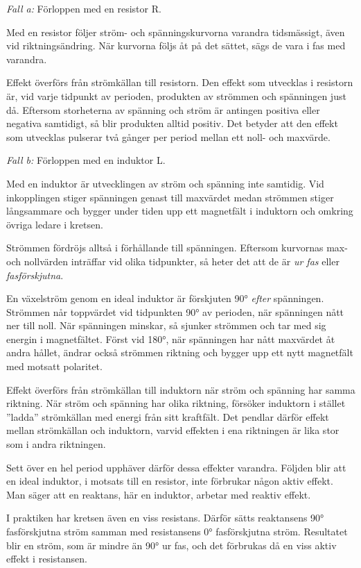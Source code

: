 \emph{Fall a:} Förloppen med en resistor R.

Med en resistor följer ström- och spänningskurvorna varandra tidsmässigt, även
vid riktningsändring. När kurvorna följs åt på det sättet, sägs de vara i fas
med varandra.

Effekt överförs från strömkällan till resistorn. Den effekt som utvecklas i
resistorn är, vid varje tidpunkt av perioden, produkten av strömmen och
spänningen just då. Eftersom storheterna av spänning och ström är antingen
positiva eller negativa samtidigt, så blir produkten alltid positiv. Det betyder
att den effekt som utvecklas pulserar två gånger per period mellan ett noll- och
maxvärde.

\emph{Fall b:} Förloppen med en induktor L.

Med en induktor är utvecklingen av ström och spänning inte samtidig. Vid
inkopplingen stiger spänningen genast till maxvärdet medan strömmen stiger
långsammare och bygger under tiden upp ett magnetfält i induktorn och omkring
övriga ledare i kretsen.

Strömmen fördröjs alltså i förhållande till spänningen. Eftersom kurvornas max-
och nollvärden inträffar vid olika tidpunkter, så heter det att de är
\emph{ur fas} eller \emph{fasförskjutna}.

En växelström genom en ideal induktor är förskjuten 90° \emph{efter}
spänningen. Strömmen når toppvärdet vid tidpunkten 90° av perioden, när
spänningen nått ner till noll. När spänningen minskar, så sjunker strömmen och
tar med sig energin i magnetfältet. Först vid 180°, när spänningen har nått
maxvärdet åt andra hållet, ändrar också strömmen riktning och bygger upp ett
nytt magnetfält med motsatt polaritet.

Effekt överförs från strömkällan till induktorn när ström och spänning har samma
riktning. När ström och spänning har olika riktning, försöker induktorn i
stället ''ladda'' strömkällan med energi från sitt kraftfält. Det pendlar därför
effekt mellan strömkällan och induktorn, varvid effekten i ena riktningen är
lika stor som i andra riktningen.

Sett över en hel period upphäver därför dessa effekter varandra. Följden blir
att en ideal induktor, i motsats till en resistor, inte förbrukar någon aktiv
effekt. Man säger att en reaktans, här en induktor, arbetar med reaktiv effekt.

I praktiken har kretsen även en viss resistans. Därför sätts reaktansens 90°
fasförskjutna ström samman med resistansens 0° fasförskjutna ström. Resultatet
blir en ström, som är mindre än 90° ur fas, och det förbrukas då en viss aktiv
effekt i resistansen.


